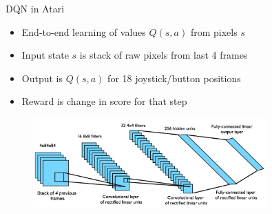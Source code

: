 \bgroup
\begin{frame}{DQN in Atari}
\begin{itemize}
\item End-to-end learning of values $Q(s, a)$ from pixels $s$
\item Input state $s$ is stack of raw pixels from last 4 frames
\item Output is $Q(s, a)$ for 18 joystick/button positions
\item Reward is change in score for that step
\end{itemize}
\begin{figure}
\centering
\includegraphics[width=0.8\textwidth]{img/dqn.JPG}
\end{figure}
\end{frame}
\egroup